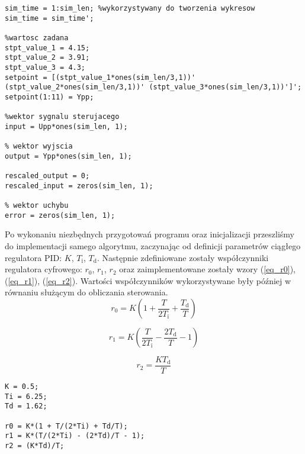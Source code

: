 \begin{lstlisting}[style=custommatlab,frame=single,label={zad4_wek_lst},caption={Inicjalizacja wektorów},captionpos=b]
%czas symulacji
sim_time = 1:sim_len; %wykorzystywany do tworzenia wykresow
sim_time = sim_time';

%wartosc zadana
stpt_value_1 = 4.15;
stpt_value_2 = 3.91;
stpt_value_3 = 4.3;
setpoint = [(stpt_value_1*ones(sim_len/3,1))' (stpt_value_2*ones(sim_len/3,1))' (stpt_value_3*ones(sim_len/3,1))']';
setpoint(1:11) = Ypp;

%wektor sygnalu sterujacego
input = Upp*ones(sim_len, 1);

% wektor wyjscia
output = Ypp*ones(sim_len, 1);

rescaled_output = 0;
rescaled_input = zeros(sim_len, 1);

% wektor uchybu
error = zeros(sim_len, 1);
\end{lstlisting}

Po wykonaniu niezbędnych przygotowań programu oraz inicjalizacji przeszliśmy do implementacji samego algorytmu, zaczynając od definicji parametrów ciągłego regulatora PID: $K$, $T_\mathrm{i}$, $T_\mathrm{d}$. Następnie zdefiniowane zostały współczynniki regulatora cyfrowego: $r_0$, $r_1$, $r_2$ oraz zaimplementowane zostały wzory (\ref{eq_r0}), (\ref{eq_r1}), (\ref{eq_r2}). Wartości współczynników wykorzystywane były później w równaniu służącym do obliczania sterowania.
\\
\begin{equation}
\label{eq_r0}
r_{0} = K (1 + \frac{T}{2 T_{\mathrm{i}}} + \frac{T_{\mathrm{d}}}{T})
\end{equation}

\begin{equation}
\label{eq_r1}
r_{1} = K (\frac{T}{2 T_{\mathrm{i}}} - \frac{2 T_{\mathrm{d}}}{T} - 1)
\end{equation}

\begin{equation}
\label{eq_r2}
r_{2} = \frac{K T_{\mathrm{d}}}{T}
\end{equation}

\begin{lstlisting}[style=custommatlab,frame=single,label={zad4_param_lst},caption={Definicja współczynników regulatora PID},captionpos=b]
K = 0.5;
Ti = 6.25;
Td = 1.62;

r0 = K*(1 + T/(2*Ti) + Td/T);
r1 = K*(T/(2*Ti) - (2*Td)/T - 1);
r2 = (K*Td)/T;
\end{lstlisting}

